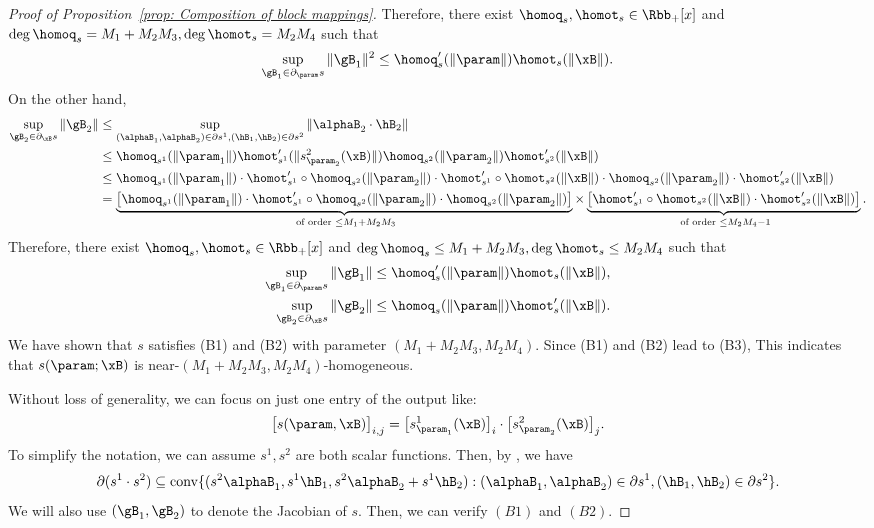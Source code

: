 \begin{proof}[Proof of Proposition~\ref{prop: Composition of block mappings}]
Therefore, there exist $\homoq_s , \homot_s \in \Rbb_+[x]$ and $\deg \homoq_s = M_1 + M_2M_3, \deg \homot_s = M_2M_4$ such that  \[\sup_{\gB_1 \in \partial_{\param} s} \|\gB_1\|^2 \le \homoq_s^\prime (\|\param\|) \homot_s(\|\xB\|).\]
On the other hand, 
\begin{align*}
    \sup_{\gB_2 \in \partial_{\xB} s}\|\gB_2\| &\le  \sup_{(\alphaB_1, \alphaB_2) \in \partial s^1, (\hB_1, \hB_2) \in \partial s^2} \|\alphaB_2 \cdot \hB_2\|\\ 
    &\le \homoq_{s^1} (\|\param_1\|) \homot_{s^1}^\prime (\|s^2_{\param_2}(\xB)\|) \homoq_{s^2} (\|\param_2\|) \homot_{s^2}^\prime (\|\xB\|)\\
    & \le \homoq_{s^1} (\|\param_1\|)\cdot \homot_{s^1}^\prime \circ \homoq_{s^2}(\|\param_2\|)\cdot \homot_{s^1}^\prime \circ \homot_{s^2}(\|\xB\|)\cdot \homoq_{s^2} (\|\param_2\|) \cdot \homot_{s^2}^\prime (\|\xB\|)\\
    & = \underbrace{\big [\homoq_{s^1} (\|\param_1\|)\cdot \homot_{s^1}^\prime \circ \homoq_{s^2}(\|\param_2\|) \cdot \homoq_{s^2} (\|\param_2\|) \big]}_{\text{ of order } \le M_1 + M_2M_3} \times \underbrace{ \big [\homot_{s^1}^\prime \circ \homot_{s^2}(\|\xB\|)\cdot \homot_{s^2}^\prime (\|\xB\|) \big] }_{\text{ of order } \le  M_2M_4-1}. 
\end{align*}
Therefore, there exist $\homoq_s , \homot_s \in \Rbb_+[x]$ and $\deg \homoq_s \le M_1 + M_2M_3, \deg \homot_s \le  M_2M_4$ such that  
\begin{align*}
    \sup_{\gB_1 \in \partial_{\param} s}\|\gB_1\| \le \homoq_s^\prime (\|\param\|) \homot_s(\|\xB\|),\\ 
    \sup_{\gB_2 \in \partial_{\xB} s}\|\gB_2\| \le \homoq_s (\|\param\|) \homot_s^\prime (\|\xB\|). 
\end{align*}
We have shown that $s$ satisfies (B1) and (B2) with parameter $(M_1 + M_2M_3, M_2M_4)$.  Since (B1) and (B2) lead to (B3), This indicates that $s(\param;\xB)$ is near-$(M_1 + M_2M_3, M_2M_4)$-homogeneous.

Without loss of generality, we can focus on just one entry of the output like: 
\[
\big[ s(\param,\xB) \big]_{i,j} =  \big[ s^1_{\param_1}(\xB) \big]_i \cdot \big[ s^2_{\param_2}(\xB) \big]_j.
\] 
To simplify the notation, we can assume $s^1, s^2$ are both scalar functions. Then, by , we have 
\[
\partial (s^1 \cdot s^2) \subseteq \text{conv} \{  (s^2\alphaB_1 , s^1 \hB_1, s^2 \alphaB_2 + s^1 \hB_2)   : (\alphaB_1, \alphaB_2) \in \partial s^1, (\hB_1, \hB_2) \in \partial s^2 \}.  
\] 
We will also use $ (\gB_1, \gB_2) $ to denote the Jacobian of $ s $. Then, we can verify $(B1)$ and $(B2)$. 


\end{proof}
